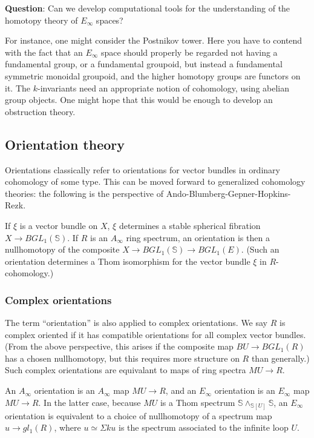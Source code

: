 \documentclass[12pt,titlepage]{article}
\theoremstyle{plain}
\theoremstyle{definition}
\theoremstyle{remark}
\begin{document}
\textbf{Question}: Can we develop computational tools for the understanding of the homotopy theory of $E_\infty$ spaces?

For instance, one might consider the Postnikov tower. Here you have to contend with the fact that an $E_\infty$ space should properly be regarded not having a fundamental group, or a fundamental groupoid, but instead a fundamental symmetric monoidal groupoid, and the higher homotopy groups are functors on it. The $k$-invariants need an appropriate notion of cohomology, using abelian group objects. One might hope that this would be enough to develop an obstruction theory.

\hypertarget{orientation_theory_7}{}\subsection{{Orientation theory}}\label{orientation_theory_7}

Orientations classically refer to orientations for vector bundles in ordinary cohomology of some type. This can be moved forward to generalized cohomology theories: the following is the perspective of Ando-Blumberg-Gepner-Hopkins-Rezk.

If $\xi$ is a vector bundle on $X$, $\xi$ determines a stable spherical fibration $X \to BGL_1(\mathbb{S})$. If $R$ is an $A_\infty$ ring spectrum, an orientation is then a nullhomotopy of the composite $X \to BGL_1(\mathbb{S}) \to BGL_1(E)$. (Such an orientation determines a Thom isomorphism for the vector bundle $\xi$ in $R$-cohomology.)

\hypertarget{complex_orientations_8}{}\subsubsection{{Complex orientations}}\label{complex_orientations_8}

The term ``{}orientation''{} is also applied to complex orientations. We say $R$ is complex oriented if it has compatible orientations for all complex vector bundles. (From the above perspective, this arises if the composite map $BU \to BGL_1(R)$ has a chosen nullhomotopy, but this requires more structure on $R$ than generally.) Such complex orientations are equivalant to maps of ring spectra $MU \to R$.

An $A_\infty$ orientation is an $A_\infty$ map $MU \to R$, and an $E_\infty$ orientation is an $E_\infty$ map $MU \to R$. In the latter case, because $MU$ is a Thom spectrum $\mathbb{S}
\wedge_{\mathbb{S}[U]} \mathbb{S}$, an $E_\infty$ orientation is equivalent to a choice of nullhomotopy of a spectrum map $u \to
gl_1(R)$, where $u \simeq \Sigma ku$ is the spectrum associated to the infinite loop $U$.
\end{document}
